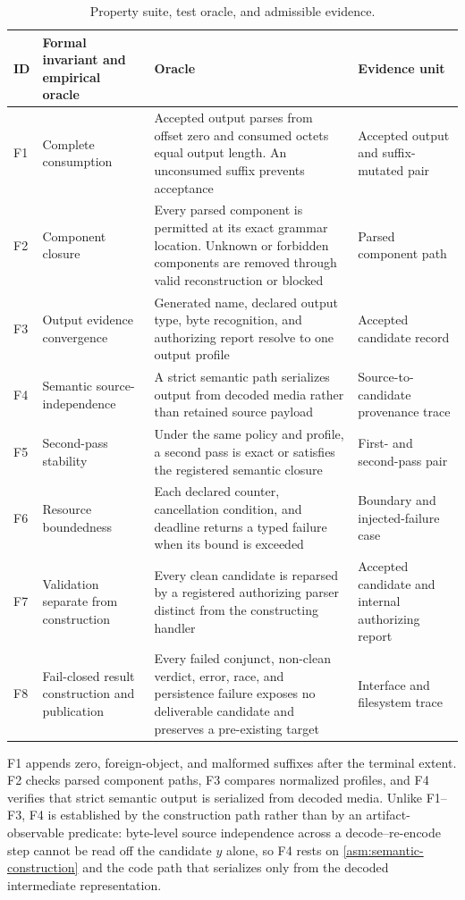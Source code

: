 \begin{table}[t]
\centering
\footnotesize
\setlength{\tabcolsep}{4pt}
\caption{Property suite, test oracle, and admissible evidence.}
\label{tab:property-suite}
\begin{tabularx}{\textwidth}{L{0.07\textwidth}L{0.19\textwidth}L{0.39\textwidth}Y}
\toprule
ID & Formal invariant and empirical oracle & Oracle & Evidence unit \\
\midrule
F1 & Complete consumption & Accepted output parses from offset zero and consumed octets equal output length. An unconsumed suffix prevents acceptance & Accepted output and suffix-mutated pair \\
F2 & Component closure & Every parsed component is permitted at its exact grammar location. Unknown or forbidden components are removed through valid reconstruction or blocked & Parsed component path \\
F3 & Output evidence convergence & Generated name, declared output type, byte recognition, and authorizing report resolve to one output profile & Accepted candidate record \\
F4 & Semantic source-independence & A strict semantic path serializes output from decoded media rather than retained source payload & Source-to-candidate provenance trace \\
F5 & Second-pass stability & Under the same policy and profile, a second pass is exact or satisfies the registered semantic closure & First- and second-pass pair \\
F6 & Resource boundedness & Each declared counter, cancellation condition, and deadline returns a typed failure when its bound is exceeded & Boundary and injected-failure case \\
F7 & Validation separate from construction & Every clean candidate is reparsed by a registered authorizing parser distinct from the constructing handler & Accepted candidate and internal authorizing report \\
F8 & Fail-closed result construction and publication & Every failed conjunct, non-clean verdict, error, race, and persistence failure exposes no deliverable candidate and preserves a pre-existing target & Interface and filesystem trace \\
\bottomrule
\end{tabularx}
\end{table}

F1 appends zero, foreign-object, and malformed suffixes after the terminal
extent. F2 checks parsed component paths, F3 compares normalized profiles, and
F4 verifies that strict semantic output is serialized from decoded media.
Unlike F1--F3, F4 is established by the construction path rather than by an
artifact-observable predicate: byte-level source independence across a
decode--re-encode step cannot be read off the candidate \(y\) alone, so F4 rests
on \cref{asm:semantic-construction} and the code path that serializes only from
the decoded intermediate representation.

